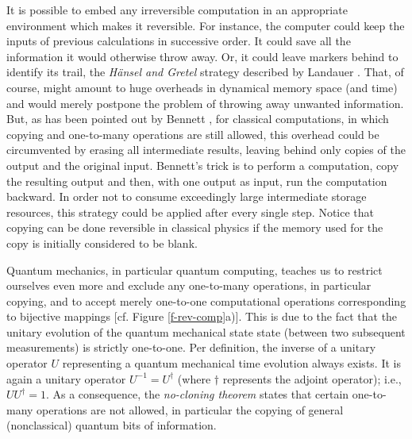 It is possible to embed any irreversible computation in an appropriate
environment which makes it reversible. For instance, the computer
could keep the inputs of previous calculations in successive order.
It could save all the information it would otherwise throw away.
 Or,
it could leave markers behind to identify its trail, the {\it H\"ansel
and Gretel} strategy described by Landauer \cite{landauer-94}. That, of
course, might amount to huge overheads in dynamical memory space
(and time) and would merely postpone the problem of throwing away
unwanted information. But, as has been pointed out by Bennett
\cite{bennett-73}, for classical computations, in which copying and
one-to-many operations are still allowed, this overhead could be
circumvented by
erasing all intermediate results, leaving behind only copies of the
output and the original input. Bennett's trick is
to perform  a computation,  copy the resulting output
and then, with one output as input, run
the computation backward. In order not to consume exceedingly large
intermediate storage resources, this strategy could be applied after
every single step.
Notice that copying can be done
reversible in classical physics if the memory used for the copy is
initially considered to be blank.

Quantum mechanics, in particular quantum computing, teaches us to
restrict ourselves even more and exclude any one-to-many operations, in
particular copying, and to accept merely one-to-one
computational operations
corresponding to bijective mappings [cf.
Figure \ref{f-rev-comp}a)].
This is due to the fact that the unitary
evolution of the quantum mechanical state state (between two subsequent
measurements) is strictly one-to-one.
Per definition, the inverse of a unitary operator $U$ representing a
quantum mechanical time evolution always exists. It is again a unitary
operator $U^{-1}=U^\dagger$ (where $\dagger$ represents the adjoint
operator); i.e., $UU^\dagger =1$.
As a consequence, the {\em no-cloning theorem}
\cite{herbert,wo-zu,mandel:83,mil-hard,glauber,caves}
states that certain one-to-many
operations are not allowed, in particular the copying of general
(nonclassical)
quantum bits of information.

